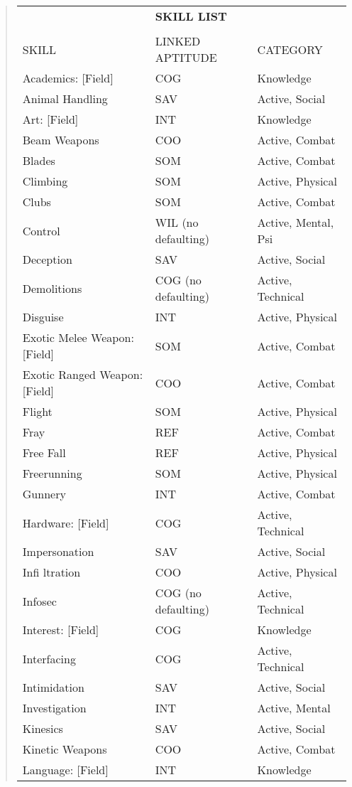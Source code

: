 \begin{quotation}
\begin{tabular}{lll}
& \textbf{SKILL LIST} &\\
\\
SKILL &  LINKED APTITUDE  & CATEGORY\\
Academics: [Field] & COG & Knowledge\\
Animal Handling & SAV & Active, Social\\
Art: [Field] & INT & Knowledge\\
Beam Weapons & COO & Active, Combat\\
Blades & SOM & Active, Combat\\
Climbing & SOM & Active, Physical\\
Clubs & SOM & Active, Combat\\
Control & WIL (no defaulting) & Active, Mental, Psi\\
Deception & SAV & Active, Social\\
Demolitions & COG (no defaulting) & Active, Technical\\
Disguise & INT & Active, Physical\\
Exotic Melee Weapon: [Field] & SOM & Active, Combat\\
Exotic Ranged Weapon: [Field] & COO & Active, Combat\\
Flight & SOM & Active, Physical\\
Fray & REF & Active, Combat\\
Free Fall & REF & Active, Physical\\
Freerunning & SOM & Active, Physical\\
Gunnery & INT & Active, Combat\\
Hardware: [Field] & COG & Active, Technical\\
Impersonation & SAV & Active, Social\\
Infi ltration & COO & Active, Physical\\
Infosec & COG (no defaulting) & Active, Technical\\
Interest: [Field] & COG & Knowledge\\
Interfacing & COG & Active, Technical\\
Intimidation & SAV & Active, Social\\
Investigation & INT & Active, Mental\\
Kinesics & SAV & Active, Social\\
Kinetic Weapons & COO & Active, Combat\\
Language: [Field] & INT & Knowledge\\

\end{tabular}
\end{quotation}
